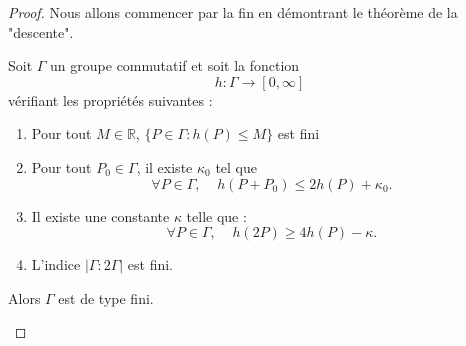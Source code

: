 \documentclass[a4paper]{article}
\begin{document}
\begin{proof}
Nous allons commencer par la fin en démontrant le théorème de la "descente".
\begin{theorem}[Descente]
Soit $\Gamma$ un groupe commutatif et soit la fonction
\begin{equation*}
h : \Gamma \rightarrow [0, \infty]
\end{equation*}
vérifiant les propriétés suivantes : 
\begin{enumerate}
\item Pour tout $M \in \mathbb{R}$, $\{P \in \Gamma : h(P) \leqslant M\}$ est fini
\item Pour tout $P_{0} \in \Gamma$, il existe $\kappa_{0}$ tel que 
\begin{equation*}
\forall P \in \Gamma, \; \; \; \; h(P+P_{0}) \leqslant 2h(P) + \kappa_{0}.
\end{equation*}
\item Il existe une constante $\kappa$ telle que :
\begin{equation*}
\forall P \in \Gamma, \; \; \; \; h(2P) \geqslant 4h(P) - \kappa. 
\end{equation*}
\item L'indice $|\Gamma:2\Gamma|$ est fini.
\end{enumerate}
Alors $\Gamma$ est de type fini.
\end{theorem}


\end{proof}
\end{document}
